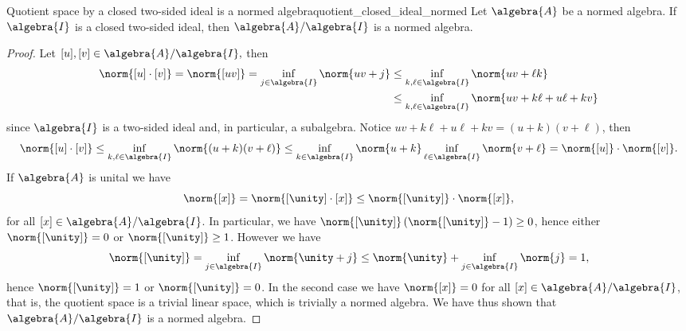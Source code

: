 \begin{lemma}{Quotient space by a closed two-sided ideal is a normed algebra}{quotient_closed_ideal_normed}
    Let \(\algebra{A}\) be a normed algebra. If \(\algebra{I}\) is a closed two-sided ideal, then \(\algebra{A}/\algebra{I}\) is a normed algebra.
\end{lemma}
\begin{proof}
    Let \([u],[v] \in \algebra{A}/\algebra{I},\) then
    \begin{align*}
        \norm{[u]\cdot[v]} = \norm{[uv]} = \inf_{j\in \algebra{I}}{\norm{uv + j}}
        &\leq \inf_{k,\ell \in \algebra{I}}{\norm{uv + \ell k}}\\
        &\leq \inf_{k,\ell \in \algebra{I}}{\norm{uv + k\ell + u \ell + kv}}
    \end{align*}
    since \(\algebra{I}\) is a two-sided ideal and, in particular, a subalgebra. Notice \(uv + k\ell + u \ell + kv = (u + k)(v + \ell)\), then
    \begin{equation*}
        \norm{[u]\cdot[v]} \leq \inf_{k,\ell \in \algebra{I}}{\norm{(u+k)(v + \ell)}}
                           \leq \inf_{k\in\algebra{I}}{\norm{u+k}}\inf_{\ell \in \algebra{I}}{\norm{v+\ell}}
                           = \norm{[u]}\cdot\norm{[v]}.
    \end{equation*}
    If \(\algebra{A}\) is unital we have
    \begin{equation*}
        \norm{[x]} = \norm{[\unity]\cdot[x]} \leq \norm{[\unity]}\cdot\norm{[x]},
    \end{equation*}
    for all \([x] \in \algebra{A}/\algebra{I}\). In particular, we have \(\norm{[\unity]}\left(\norm{[\unity]} - 1\right) \geq 0\), hence either \(\norm{[\unity]} = 0\) or \(\norm{[\unity]}\geq 1\). However we have
    \begin{equation*}
        \norm{[\unity]} = \inf_{j\in \algebra{I}}{\norm{\unity + j}} \leq \norm{\unity}+\inf_{j\in\algebra{I}}{\norm{j}} = 1,
    \end{equation*}
    hence \(\norm{[\unity]} = 1\) or \(\norm{[\unity]} = 0\). In the second case we have \(\norm{[x]} = 0\) for all \([x] \in \algebra{A}/\algebra{I}\), that is, the quotient space is a trivial linear space, which is trivially a normed algebra. We have thus shown that \(\algebra{A}/\algebra{I}\) is a normed algebra.
\end{proof}

